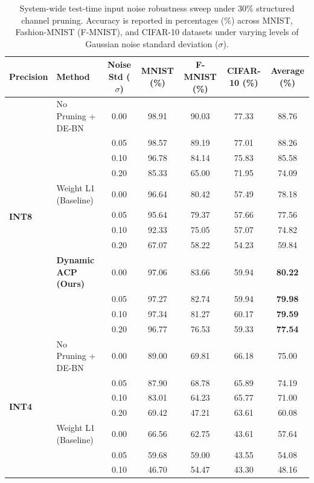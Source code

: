 \documentclass{article}
\theoremstyle{plain}
\theoremstyle{definition}
\theoremstyle{remark}
\begin{document}
\begin{table}[h]
\caption{System-wide test-time input noise robustness sweep under 30\% structured channel pruning. Accuracy is reported in percentages (\%) across MNIST, Fashion-MNIST (F-MNIST), and CIFAR-10 datasets under varying levels of Gaussian noise standard deviation ($\sigma$).}
\label{tab:noise_results}
\vskip 0.15in
\begin{center}
\begin{small}
\begin{sc}
\setlength{\tabcolsep}{6.0pt}
\begin{tabular}{llccccc}
\toprule
Precision & Method & Noise Std ($\sigma$) & MNIST (\%) & F-MNIST (\%) & CIFAR-10 (\%) & Average (\%) \\
\midrule
\multirow{12}{*}{\textbf{INT8}} 
& No Pruning + DE-BN & 0.00 & 98.91 & 90.03 & 77.33 & 88.76 \\
& & 0.05 & 98.57 & 89.19 & 77.01 & 88.26 \\
& & 0.10 & 96.78 & 84.14 & 75.83 & 85.58 \\
& & 0.20 & 85.33 & 65.00 & 71.95 & 74.09 \\
\cmidrule{2-7}
& Weight L1 (Baseline) & 0.00 & 96.64 & 80.42 & 57.49 & 78.18 \\
& & 0.05 & 95.64 & 79.37 & 57.66 & 77.56 \\
& & 0.10 & 92.33 & 75.05 & 57.07 & 74.82 \\
& & 0.20 & 67.07 & 58.22 & 54.23 & 59.84 \\
\cmidrule{2-7}
& \textbf{Dynamic ACP (Ours)} & 0.00 & 97.06 & 83.66 & 59.94 & \textbf{80.22} \\
& & 0.05 & 97.27 & 82.74 & 59.94 & \textbf{79.98} \\
& & 0.10 & 97.34 & 81.27 & 60.17 & \textbf{79.59} \\
& & 0.20 & 96.77 & 76.53 & 59.33 & \textbf{77.54} \\
\midrule
\multirow{12}{*}{\textbf{INT4}} 
& No Pruning + DE-BN & 0.00 & 89.00 & 69.81 & 66.18 & 75.00 \\
& & 0.05 & 87.90 & 68.78 & 65.89 & 74.19 \\
& & 0.10 & 83.01 & 64.23 & 65.77 & 71.00 \\
& & 0.20 & 69.42 & 47.21 & 63.61 & 60.08 \\
\cmidrule{2-7}
& Weight L1 (Baseline) & 0.00 & 66.56 & 62.75 & 43.61 & 57.64 \\
& & 0.05 & 59.68 & 59.00 & 43.55 & 54.08 \\
& & 0.10 & 46.70 & 54.47 & 43.30 & 48.16 \\

\end{tabular}
\end{sc}
\end{small}
\end{center}
\end{table}
\end{document}
